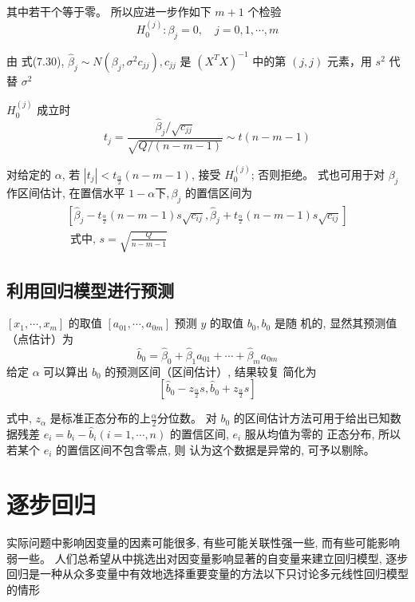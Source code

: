 其中若干个等于零。 所以应进一步作如下 \( {m}+{1} \) 个检验
$$H_{0}^{(j)}: \beta_{j}=0, \quad j=0,1, \cdots, m $$

由 式(7.30), $\hat{\beta}_{j} \sim N\left(\beta_{j}, \sigma^{2} c_{j j}\right), c_{j j}$  是 $\left(X^{T} X\right)^{-1}$  中的第 $ (j, j) $ 元素，用 $ s^{2} $ 代替 $ \sigma^{2} $


\( {H}_{0}^{(j)} \) 成立时
$$
t_{j}=\frac{\hat{\beta}_{j} / \sqrt{c_{j j}}}{\sqrt{Q /(n-m-1)}} \sim t(n-m-1)
$$

对给定的 $ \alpha $, 若 $ \left|t_{j}\right|<t_{\frac{\alpha}{2}}(n-m-1) $, 接受 $ H_{0}^{(j)} $; 否则拒绝。  式也可用于对 \( \beta_{j} \) 作区间估计, 在置信水平 \( 1-\alpha 下, \beta_{j} \) 的置信区间为
$$
\begin{array}{l}
{\left[\hat{\beta}_{j}-t_{\frac{\alpha}{2}}(n-m-1) s \sqrt{c_{i j}}, \hat{\beta}_{j}+t_{\frac{\alpha}{2}}(n-m-1) s \sqrt{c_{i j}}\right]} \\
\text { 式中, } s=\sqrt{\frac{Q}{n-m-1}} 
\end{array}
$$

\subsection{利用回归模型进行预测}

\( \left[x_{1}, \cdots, x_{m}\right] \) 的取值 \( \left[a_{01}, \cdots, a_{0 m}\right] \) 预测 \( y \) 的取值 \( b_{0}, b_{0} \) 是随 机的, 显然其预测值（点估计）为
$$
\hat{b}_{0}=\hat{\beta}_{0}+\hat{\beta}_{1} a_{01}+\cdots+\hat{\beta}_{m} a_{0 m} 
$$
给定 \( \alpha \) 可以算出 \( {b}_{{0}} \) 的预测区间（区间估计）, 结果较复
简化为
$$
\left[\hat{b}_{0}-z_{\frac{\alpha}{2}} s, \hat{b}_{0}+z_{\frac{\alpha}{2}} s\right]
$$

式中, \( {z}_{\alpha} \) 是标准正态分布的上$\frac{\alpha}{2} $分位数。 
对 \( {b}_{0} \) 的区间估计方法可用于给出已知数据残差 \( {e}_{i}={b}_{{i}}-\hat{{b}}_{{i}}({i}={1}, \cdots, {n}) \) 的置信区间, \( {e}_{i} \) 服从均值为零的
正态分布, 所以若某个 \( e_{i} \) 的置信区间不包含零点, 则 认为这个数据是异常的, 可予以剔除。 

\section{逐步回归}

实际问题中影响因变量的因素可能很多, 有些可能关联性强一些, 而有些可能影响弱一些。 人们总希望从中挑选出对因变量影响显著的自变量来建立回归模型, 逐步回归是一种从众多变量中有效地选择重要变量的方法以下只讨论多元线性回归模型的情形

